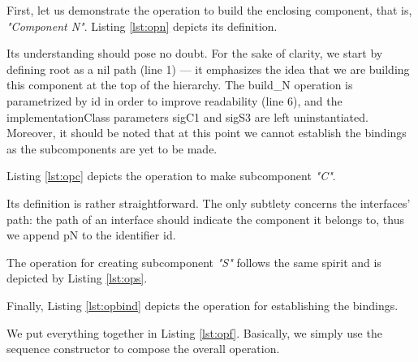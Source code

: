 		
	First, let us demonstrate the \textsf{operation} to build the enclosing \textsf{component}, that is,
	\textit{"Component N"}. Listing \ref{lst:opn} depicts its definition.	
	
		
	
	\noindent Its understanding should pose no doubt. For the sake of clarity, we start by defining 
	\textsf{root} as a \textsf{nil} \textsf{path} (line 1) --- it emphasizes the idea that we are building
	this component at the top of the hierarchy. The \textsf{build\_N} operation is parametrized by \textsf{id} in
	order to improve readability (line 6), and the \textsf{implementationClass} parameters \textsf{sigC1} and
	\textsf{sigS3} are left uninstantiated. Moreover, it should be noted that at this point
	we cannot establish the \textsf{binding}s as the sub\textsf{component}s are yet to be made.
	
			Listing \ref{lst:opc} depicts the \textsf{operation} to make sub\textsf{component} \textit{"C"}.	
		
		
	
	\noindent Its definition is rather straightforward.	The only subtlety concerns the \textsf{interface}s' \textsf{path}:
	the \textsf{path} of an \textsf{interface} should indicate the \textsf{component} it belongs to, thus we append
	\textsf{pN} to the \textsf{identifier} \textsf{id}.
	
		The \textsf{operation} for creating sub\textsf{component} \textit{"S"} follows the same spirit and is depicted
		by Listing \ref{lst:ops}.	
	
		
	
	Finally, Listing \ref{lst:opbind} depicts the \textsf{operation} for establishing the \textsf{binding}s.
	
			
	
	We put everything together in Listing \ref{lst:opf}. Basically, we simply use the sequence constructor
	to compose the overall \textsf{operation}.
	
